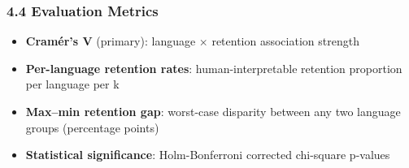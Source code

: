 \subsubsection{4.4 Evaluation Metrics}

\begin{itemize}
\item \textbf{Cramér's V} (primary): language $\times$ retention association strength
\item \textbf{Per-language retention rates}: human-interpretable retention proportion per language per k
\item \textbf{Max--min retention gap}: worst-case disparity between any two language groups (percentage points)
\item \textbf{Statistical significance}: Holm-Bonferroni corrected chi-square p-values
\end{itemize}

